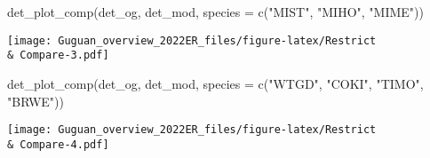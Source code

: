 \documentclass[
]{article}
\newenvironment{Shaded}{\begin{snugshade}}{\end{snugshade}}
\newcommand{\AttributeTok}[1]{\textcolor[rgb]{0.77,0.63,0.00}{#1}}
\newcommand{\FunctionTok}[1]{\textcolor[rgb]{0.00,0.00,0.00}{#1}}
\newcommand{\NormalTok}[1]{#1}
\newcommand{\StringTok}[1]{\textcolor[rgb]{0.31,0.60,0.02}{#1}}
\begin{document}
\begin{Shaded}
\begin{Highlighting}[]
\FunctionTok{det\_plot\_comp}\NormalTok{(det\_og, det\_mod, }\AttributeTok{species =} \FunctionTok{c}\NormalTok{(}\StringTok{"MIST"}\NormalTok{, }\StringTok{"MIHO"}\NormalTok{, }\StringTok{"MIME"}\NormalTok{))}
\end{Highlighting}
\end{Shaded}

\texttt{[image: Guguan\_overview\_2022ER\_files/figure-latex/Restrict \\\& Compare-3.pdf]}

\begin{Shaded}
\begin{Highlighting}[]
\FunctionTok{det\_plot\_comp}\NormalTok{(det\_og, det\_mod, }\AttributeTok{species =} \FunctionTok{c}\NormalTok{(}\StringTok{"WTGD"}\NormalTok{, }\StringTok{"COKI"}\NormalTok{, }\StringTok{"TIMO"}\NormalTok{, }\StringTok{"BRWE"}\NormalTok{))}
\end{Highlighting}
\end{Shaded}

\texttt{[image: Guguan\_overview\_2022ER\_files/figure-latex/Restrict \\\& Compare-4.pdf]}
\end{document}
